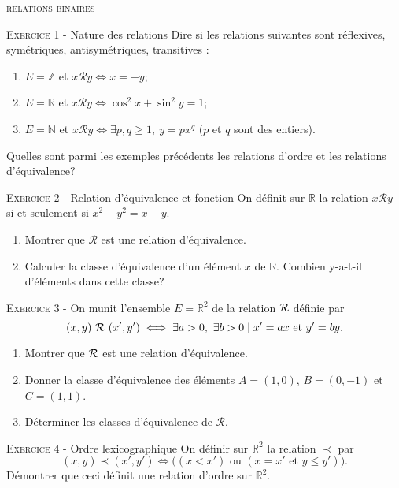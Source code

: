 \documentclass[11pt]{article}
\begin{document}
 

\begin{center}\textsc{{\huge relations binaires }}\end{center}



\vskip0.3cm\noindent\textsc{Exercice 1} - Nature des relations
\vskip0.2cm
Dire si les relations suivantes sont réflexives, symétriques, antisymétriques, transitives :
\begin{enumerate}
\item $E=\mathbb Z$ et $x\mathcal R y\iff x=-y$;
\item $E=\mathbb R$ et $x\mathcal R y\iff \cos^2 x+\sin^2 y=1$;
\item $E=\mathbb N$ et $x\mathcal R y\iff \exists p,q\geq 1,\ y=px^q$ ($p$ et $q$ sont des entiers).
\end{enumerate}
Quelles sont parmi les exemples précédents les relations d'ordre et les relations d'équivalence?




\vskip0.3cm\noindent\textsc{Exercice 2} - Relation d'équivalence et fonction
\vskip0.2cm
On définit sur $\mathbb R$ la relation $x\mathcal R y$ si et seulement si
$x^2-y^2=x-y$.
\begin{enumerate}
\item Montrer que $\mathcal R$ est une relation d'équivalence.
\item Calculer la classe d'équivalence d'un élément $x$ de $\mathbb R$.
Combien y-a-t-il d'éléments dans cette classe?
\end{enumerate}




\vskip0.3cm\noindent\textsc{Exercice 3} - 
\vskip0.2cm
On munit  l'ensemble $E=\mathbb R^2$ de la relation $\cal R$ définie par 
$$(x, y)\ {\cal R}\ (x',y')\iff\exists a>0,\ \exists b>0\mid x'=ax{\rm \ et\ }y'=by.$$
\begin{enumerate}
\item Montrer que $\cal R$ est une relation d'équivalence.
\item Donner la classe d'équivalence des éléments $A=(1,0)$, $B=(0,-1)$ et $C=(1,1)$.
\item Déterminer les classes d'équivalence de $\mathcal{R}$.
\end{enumerate}




\vskip0.3cm\noindent\textsc{Exercice 4} - Ordre lexicographique
\vskip0.2cm
On définir sur $\mathbb R^2$ la relation $\prec$ par 
$$(x,y)\prec (x',y')\iff \big( (x<x')\textrm{ ou }(x=x'\textrm{ et }y\leq y')\big).$$
Démontrer que ceci définit une relation d'ordre sur $\mathbb R^2$. 
\end{document}
